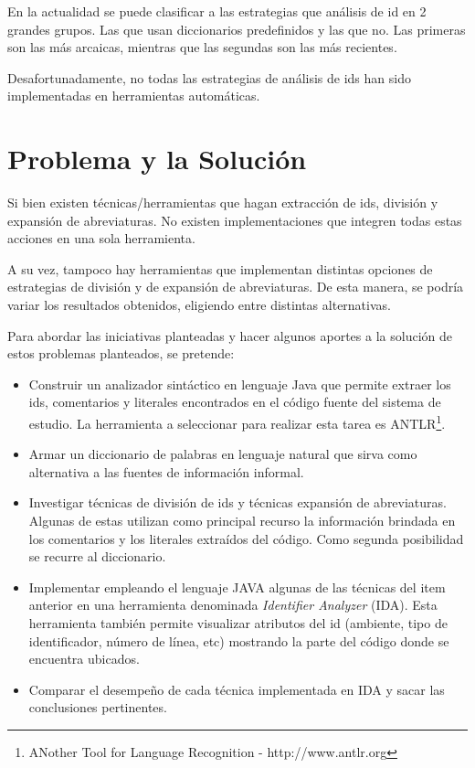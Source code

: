 \documentclass[a4paper,12pt]{report}
\begin{document}
En la actualidad se puede clasificar a las estrategias que análisis de id en 2 grandes grupos. Las que usan diccionarios predefinidos y las que no. Las primeras son las más arcaicas, mientras que las segundas son las más recientes.

Desafortunadamente, no todas las estrategias de análisis de ids han sido implementadas en herramientas automáticas.

\pagebreak
\section{Problema y la Solución}

Si bien existen técnicas/herramientas que hagan extracción de ids, división y expansión de abreviaturas. No existen implementaciones que integren todas estas acciones en una sola herramienta.

A su vez, tampoco hay herramientas que implementan distintas opciones de estrategias de división y de expansión de abreviaturas. De esta manera, se podría variar los resultados obtenidos, eligiendo entre distintas alternativas.

Para abordar las iniciativas planteadas y hacer algunos aportes a la solución de estos problemas planteados, se pretende:

\begin{itemize}
\itemsep0em%
\item Construir un analizador sintáctico en lenguaje Java que permite extraer los ids, comentarios y literales encontrados en el código fuente del sistema de estudio. La herramienta a seleccionar para realizar esta tarea es ANTLR\footnote[1]{ANother Tool for Language Recognition - http://www.antlr.org}.

\item Armar un diccionario de palabras en lenguaje natural que sirva como alternativa a las fuentes de información informal.

\item Investigar técnicas de división de ids y técnicas expansión de abreviaturas. Algunas de estas utilizan como principal recurso la información brindada en los comentarios y los literales extraídos del código. Como segunda posibilidad se recurre al diccionario.

\item Implementar empleando el lenguaje JAVA algunas de las técnicas del item anterior en una herramienta denominada \textit{Identifier Analyzer} (IDA). Esta herramienta también permite visualizar atributos del id (ambiente, tipo de identificador, número de línea, etc) mostrando la parte del código donde se encuentra ubicados.


\item Comparar el desempeño de cada técnica implementada en IDA y sacar las conclusiones pertinentes.

\end{itemize}
\end{document}
